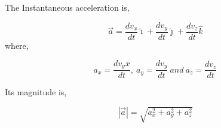\documentclass[]{beamer}
\begin{document}






\begin{frame}
The Instantaneous acceleration  is,

    \vspace{3mm}

         \begin{equation}
          \vec{a}=\frac{dv_x}{dt}\hat{\imath}+\frac{dv_y}{dt}\hat{\jmath}+\frac{dv_z}{dt}\hat{k}
         \end{equation}
   \vspace{3mm}
where,

   \begin{equation}
       a_x=\frac{dv_yx}{dt},~ a_y=\frac{dv_y}{dt}~and~a_z=\frac{dv_z}{dt}
         \end{equation}

        \vspace{3mm}
Its magnitude is,


        \vspace{3mm}



         \begin{equation}
          |\vec{a}|=\sqrt{a^2_x+a^2_y+a^2_z}
         \end{equation}




\end{frame}

\end{document}
